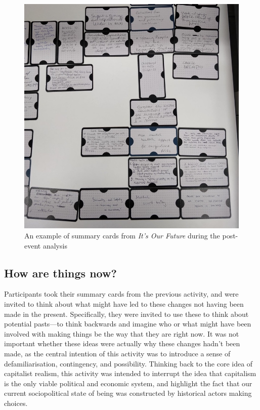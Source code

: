 \begin{figure}[hbt!]
    \centering
    \includegraphics[width=1\linewidth]{Images/7/summary-cards.jpeg}

    \caption{An example of summary cards from \textit{It's Our Future} during the post-event analysis}
    \label{fig:summary-cards}
\end{figure}
\subsection{How are things now?}
Participants took their summary cards from the previous activity, and were invited to think about what might have led to these changes not having been made in the present. Specifically, they were invited to use these to think about potential pasts—to think backwards and imagine who or what might have been involved with making things be the way that they are right now. It was not important whether these ideas were actually why these changes hadn't been made, as the central intention of this activity was to introduce a sense of defamiliarisation, contingency, and possibility. Thinking back to the core idea of capitalist realism, this activity was intended to interrupt the idea that capitalism is the only viable political and economic system, and highlight the fact that our current sociopolitical state of being was constructed by historical actors making choices.

